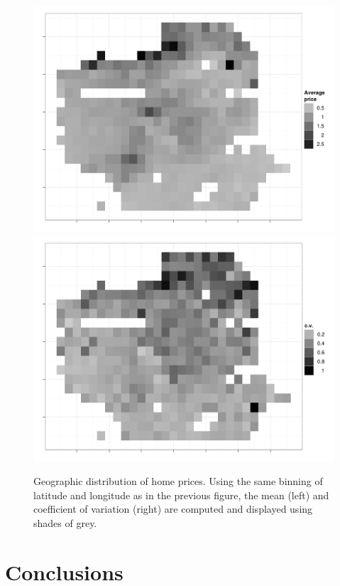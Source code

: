 \documentclass[oneside]{article}
\begin{document}
\begin{figure}[htbp]
  \centering
    \includegraphics[width=0.5\linewidth]{sf-bin-price}%
    \includegraphics[width=0.5\linewidth]{sf-bin-cv}
  \caption{Geographic distribution of home prices.  Using the same binning of latitude and longitude as in the previous figure, the mean (left) and coefficient of variation (right) are computed and displayed using shades of grey.}
  \label{fig:sf-price}
\end{figure}


\section{Conclusions}

\end{document}
